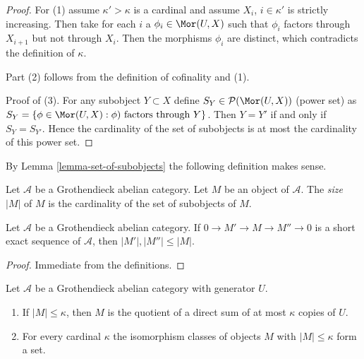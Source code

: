 \begin{proof}
For (1) assume $\kappa' > \kappa$ is a cardinal and assume
$X_i$, $i \in \kappa'$ is strictly increasing. Then take for
each $i$ a $\phi_i \in \Mor(U, X)$ such that $\phi_i$ factors through
$X_{i + 1}$ but not through $X_i$. Then the morphisms $\phi_i$
are distinct, which contradicts the definition of $\kappa$.

\medskip\noindent
Part (2) follows from the definition of cofinality and (1).

\medskip\noindent
Proof of (3). For any subobject $Y \subset X$
define $S_Y \in \mathcal{P}(\Mor(U, X))$ (power set) as
$S_Y = \{\phi \in \Mor(U,X) : \phi)\text{ factors through }Y\}$.
Then $Y = Y'$ if and only if $S_Y = S_{Y'}$. Hence the cardinality
of the set of subobjects is at most the cardinality of this power set.
\end{proof}

\noindent
By Lemma \ref{lemma-set-of-subobjects} the following definition makes sense.

\begin{definition}
\label{definition-size}
Let $\mathcal{A}$ be a Grothendieck abelian category.
Let $M$ be an object of $\mathcal{A}$.
The {\it size} $|M|$ of $M$ is the cardinality of the set of subobjects
of $M$.
\end{definition}

\begin{lemma}
\label{lemma-size-goes-down}
Let $\mathcal{A}$ be a Grothendieck abelian category.
If $0 \to M' \to M \to M'' \to 0$ is a short exact sequence of
$\mathcal{A}$, then $|M'|, |M''| \leq |M|$.
\end{lemma}

\begin{proof}
Immediate from the definitions.
\end{proof}

\begin{lemma}
\label{lemma-set-iso-classes-bounded-size}
Let $\mathcal{A}$ be a Grothendieck abelian category with generator $U$.
\begin{enumerate}
\item If $|M| \leq \kappa$, then $M$ is the quotient of a direct
sum of at most $\kappa$ copies of $U$.
\item For every cardinal $\kappa$ the isomorphism classes
of objects $M$ with $|M| \leq \kappa$ form a set.
\end{enumerate}
\end{lemma}

